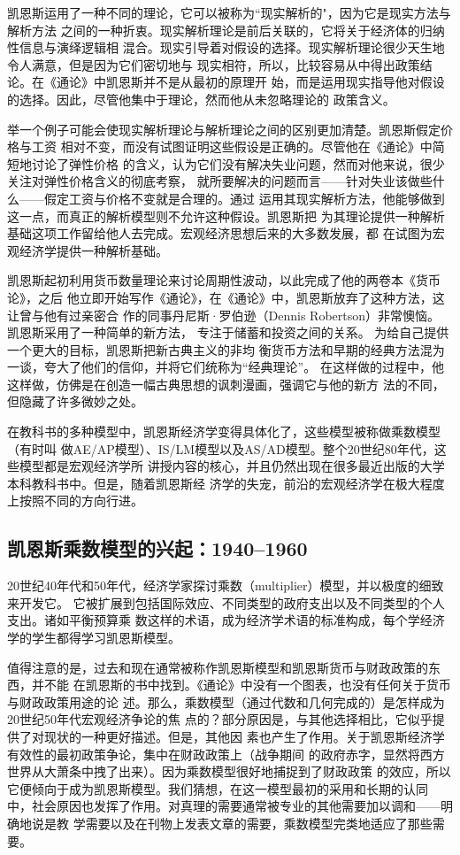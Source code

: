 凯恩斯运用了一种不同的理论，它可以被称为“现实解析的"，因为它是现实方法与解析方法
之间的一种折衷。现实解析理论是前后关联的，它将关于经济体的归纳性信息与演绎逻辑相
混合。现实引导着对假设的选择。现实解析理论很少天生地令人满意，但是因为它们密切地与
现实相符，所以，比较容易从中得出政策结论。在《通论》中凯恩斯并不是从最初的原理开
始，而是运用现实指导他对假设的选择。因此，尽管他集中于理论，然而他从未忽略理论的
政策含义。

举一个例子可能会使现实解析理论与解析理论之间的区别更加清楚。凯恩斯假定价格与工资
相对不变，而没有试图证明这些假设是正确的。尽管他在《通论》中简短地讨论了弹性价格
的含义，认为它们没有解决失业问题，然而对他来说，很少关注对弹性价格含义的彻底考察，
就所要解决的问题而言——针对失业该做些什么——假定工资与价格不变就是合理的。通过
运用其现实解析方法，他能够做到这一点，而真正的解析模型则不允许这种假设。凯恩斯把
为其理论提供一种解析基础这项工作留给他人去完成。宏观经济思想后来的大多数发展，都
在试图为宏观经济学提供一种解析基础。

凯恩斯起初利用货币数量理论来讨论周期性波动，以此完成了他的两卷本《货币论》，之后
他立即开始写作《通论》，在《通论》中，凯恩斯放弃了这种方法，这让曾与他有过亲密合
作的同事丹尼斯·罗伯逊（Dennis Robertson）非常懊恼。 凯恩斯采用了一种简单的新方法，
专注于储蓄和投资之间的关系。 为给自己提供一个更大的目标，凯恩斯把新古典主义的非均
衡货币方法和早期的经典方法混为一谈，夸大了他们的信仰，并将它们统称为“经典理论”。
在这样做的过程中，他这样做，仿佛是在创造一幅古典思想的讽刺漫画，强调它与他的新方
法的不同，但隐藏了许多微妙之处。

在教科书的多种模型中，凯恩斯经济学变得具体化了，这些模型被称做乘数模型（有时叫
做AE/AP模型）、IS/LM模型以及AS/AD模型。整个20世纪80年代，这些模型都是宏观经济学所
讲授内容的核心，并且仍然出现在很多最近出版的大学本科教科书中。但是，随着凯恩斯经
济学的失宠，前沿的宏观经济学在极大程度上按照不同的方向行进。

\subsection{凯恩斯乘数模型的兴起：1940--1960}

20世纪40年代和50年代，经济学家探讨乘数（multiplier）模型，并以极度的细致来开发它。
它被扩展到包括国际效应、不同类型的政府支出以及不同类型的个人支出。诸如平衡预算乘
数这样的术语，成为经济学术语的标准构成，每个学经济学的学生都得学习凯恩斯模型。

值得注意的是，过去和现在通常被称作凯恩斯模型和凯恩斯货币与财政政策的东西，并不能
在凯恩斯的书中找到。《通论》中没有一个图表，也没有任何关于货币与财政政策用途的论
述。那么，乘数模型（通过代数和几何完成的）是怎样成为20世纪50年代宏观经济争论的焦
点的？部分原因是，与其他选择相比，它似乎提供了对现状的一种更好描述。但是，其他因
素也产生了作用。关于凯恩斯经济学有效性的最初政策争论，集中在财政政策上（战争期间
的政府赤字，显然将西方世界从大萧条中拽了出来）。因为乘数模型很好地捕捉到了财政政策
的效应，所以它便倾向于成为凯恩斯模型。我们猜想，在这一模型最初的采用和长期的认同
中，社会原因也发挥了作用。对真理的需要通常被专业的其他需要加以调和——明确地说是教
学需要以及在刊物上发表文章的需要，乘数模型完类地适应了那些需要。

